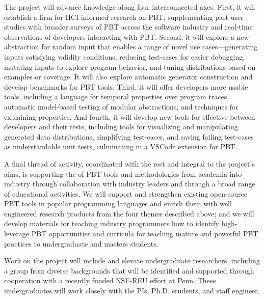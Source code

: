 The project will advance knowledge along four
interconnected axes.
%
First, it will establish a firm  for HCI-informed
research on PBT, supplementing past user studies with
broader surveys of PBT across the software industry and real-time
observations of developers interacting with PBT.
%
Second, it will explore a new abstraction for random input
 that enables a range of novel use
cases---generating inputs satisfying validity conditions, reducing
test-cases for easier debugging, mutating inputs to explore program
behavior, and tuning distributions based on examples or coverage. It
will also explore automatic generator construction and develop
benchmarks for PBT tools.
%
Third, it will offer developers more usable  tools,
including a language for temporal properties over program traces,
\iflater{}\fi
automatic model-based testing of
modular abstractions, and techniques for explaining properties.
%
And fourth, it will develop new tools for effective
 between developers and their tests, including
tools for visualizing and manipulating generated data
distributions, simplifying test-cases, and saving
  failing test-cases as understandable unit tests, culminating in a VSCode
  extension for PBT.  \iflater{}\fi

A final thread of activity, coordinated with the rest and integral to the
project's aims,
is supporting the  of PBT tools and
methodologies from academia into industry through collaboration with
industry leaders and through a broad range of educational activities.
We will support and strengthen existing
open-source PBT tools in popular programming languages and enrich them
with well engineered research products from the four
themes described above;
and we will
develop materials for teaching industry programmers how to identify
high-leverage PBT opportunities and curricula for teaching mature
and powerful PBT practices to undergraduate and masters students.

Work on the project will include and elevate undergraduate
researchers, including a group from
diverse backgrounds that will be identified and supported through
cooperation with a recently funded NSF-REU effort at Penn. These
undergraduates will work closely with the PIs, Ph.D.{} students, and
staff engineer.


